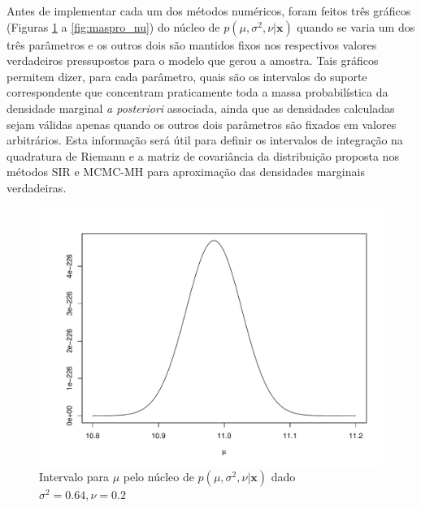 \documentclass[12pt,reqno,a4paper,oneside]{article}
\begin{document}
Antes de implementar cada um dos métodos numéricos, foram feitos três gráficos (Figuras \ref{fig:maspro_mu} a \ref{fig:maspro_nu}) do núcleo de $p(\mu, \sigma^2, \nu | \bm{x})$ quando se varia um dos três parâmetros e os outros dois são mantidos fixos nos respectivos valores verdadeiros pressupostos para o modelo que gerou a amostra. Tais gráficos permitem dizer, para cada parâmetro, quais são os intervalos do suporte correspondente que concentram praticamente toda a massa probabilística da densidade marginal \textit{a posteriori} associada, ainda que as densidades calculadas sejam válidas apenas quando os outros dois parâmetros são fixados em valores arbitrários. Esta informação será útil para definir os intervalos de integração na quadratura de Riemann e a matriz de covariância da distribuição proposta nos métodos SIR e MCMC-MH para aproximação das densidades marginais verdadeiras.

\begin{figure}[htb]
	\centering
	\includegraphics[scale=0.7]{figuras/maspro_mu.pdf}
	\caption{Intervalo para $\mu$ pelo núcleo de $p(\mu, \sigma^2, \nu | \bm{x})$ dado $\sigma^2 = 0.64, \nu = 0.2$}
	\label{fig:maspro_mu}
\end{figure}
\end{document}
